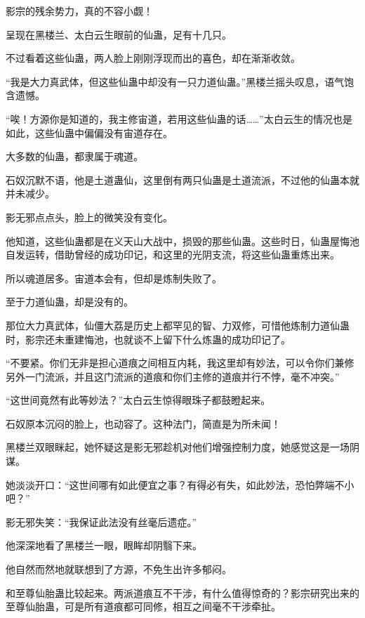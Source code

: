 
\begin{this_body}



影宗的残余势力，真的不容小觑！

呈现在黑楼兰、太白云生眼前的仙蛊，足有十几只。

不过看着这些仙蛊，两人脸上刚刚浮现而出的喜色，却在渐渐收敛。

“我是大力真武体，但这些仙蛊中却没有一只力道仙蛊。”黑楼兰摇头叹息，语气饱含遗憾。

“唉！方源你是知道的，我主修宙道，若用这些仙蛊的话……”太白云生的情况也是如此，这些仙蛊中偏偏没有宙道存在。

大多数的仙蛊，都隶属于魂道。

石奴沉默不语，他是土道蛊仙，这里倒有两只仙蛊是土道流派，不过他的仙蛊本就并未减少。

影无邪点点头，脸上的微笑没有变化。

他知道，这些仙蛊都是在义天山大战中，损毁的那些仙蛊。这些时日，仙蛊屋悔池自发运转，借助曾经的成功印记，和这里的光阴支流，将这些仙蛊重炼出来。

所以魂道居多。宙道本会有，但却是炼制失败了。

至于力道仙蛊，却是没有的。

那位大力真武体，仙僵大荔是历史上都罕见的智、力双修，可惜他炼制力道仙蛊时，影宗还未重建悔池，也就谈不上留下什么炼蛊的成功印记了。

“不要紧。你们无非是担心道痕之间相互内耗，我这里却有妙法，可以令你们兼修另外一门流派，并且这门流派的道痕和你们主修的道痕并行不悖，毫不冲突。”

“这世间竟然有此等妙法？”太白云生惊得眼珠子都鼓瞪起来。

石奴原本沉闷的脸上，也动容了。这种法门，简直是为所未闻！

黑楼兰双眼眯起，她怀疑这是影无邪趁机对他们增强控制力度，她感觉这是一场阴谋。

她淡淡开口：“这世间哪有如此便宜之事？有得必有失，如此妙法，恐怕弊端不小吧？”

影无邪失笑：“我保证此法没有丝毫后遗症。”

他深深地看了黑楼兰一眼，眼眸却阴翳下来。

他自然而然地就联想到了方源，不免生出许多郁闷。

和至尊仙胎蛊比较起来。两派道痕互不干涉，有什么值得惊奇的？影宗研究出来的至尊仙胎蛊，可是所有道痕都可同修，相互之间毫不干涉牵扯。


\end{this_body}
